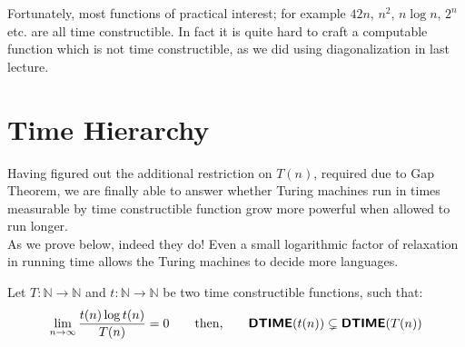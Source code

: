 \documentclass[usletter]{article}
\newcommand {\namedset}[1]     {\ensuremath{\mathbb{#1}}}
\newcommand {\family}[1]       {\ensuremath{\textnormal{\textsf{\textbf{#1}}}}}
\newcommand {\term}[1]      {\textsf{#1}}
\newcommand {\namethm}[1]   {\term{#1} Theorem}
\begin{document}
\noindent
Fortunately, most functions of practical interest; for example
$42n$, $n^2$, $n\log{n}$, $2^n$ etc. are all \term{time constructible}. In fact
it is quite hard to craft a computable function which is not
\term{time constructible}, as we did using diagonalization in last lecture.


\section{Time Hierarchy}

Having figured out the additional restriction on $T(n)$, required due to
\namethm{Gap}, we are finally able to answer whether Turing machines run in
times measurable by \term{time constructible} function grow more powerful when
allowed to run longer. \\
As we prove below, indeed they do! Even a small logarithmic factor of relaxation
in running time allows the Turing machines to decide more languages.

\begin{theorem}
\label{dtime_hierarchy_theorem}
Let $T: \namedset{N} \to \namedset{N}$ and $t: \namedset{N} \to \namedset{N}$ be
two \term{time constructible} functions, such that:
$$
\lim_{n \to \infty} \frac{t(n) \log{t(n)}}{T(n)} = 0
\qquad \textnormal{then,}
\qquad \family{DTIME}(t(n)) \subsetneq \family{DTIME}(T(n))
$$
\end{theorem}
\end{document}
